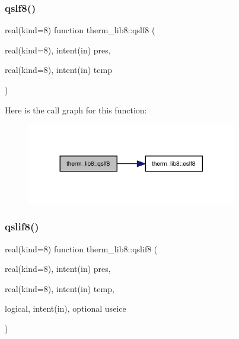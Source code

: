 \subsubsection{\texorpdfstring{qslf8()}{qslf8()}}
{\footnotesize\ttfamily real(kind=8) function therm\+\_\+lib8\+::qslf8 (\begin{DoxyParamCaption}\item[{real(kind=8), intent(in)}]{pres,  }\item[{real(kind=8), intent(in)}]{temp }\end{DoxyParamCaption})}

Here is the call graph for this function\+:
\nopagebreak
\begin{figure}[H]
\begin{center}
\leavevmode
\includegraphics[width=260pt]{namespacetherm__lib8_a91c0c02e09a53dfba149bcb4b83d13f6_cgraph}
\end{center}
\end{figure}
\mbox{\label{namespacetherm__lib8_aa9d6ede67f0021ccc80049f582b3177b}} 
\subsubsection{\texorpdfstring{qslif8()}{qslif8()}}
{\footnotesize\ttfamily real(kind=8) function therm\+\_\+lib8\+::qslif8 (\begin{DoxyParamCaption}\item[{real(kind=8), intent(in)}]{pres,  }\item[{real(kind=8), intent(in)}]{temp,  }\item[{logical, intent(in), optional}]{useice }\end{DoxyParamCaption})}

